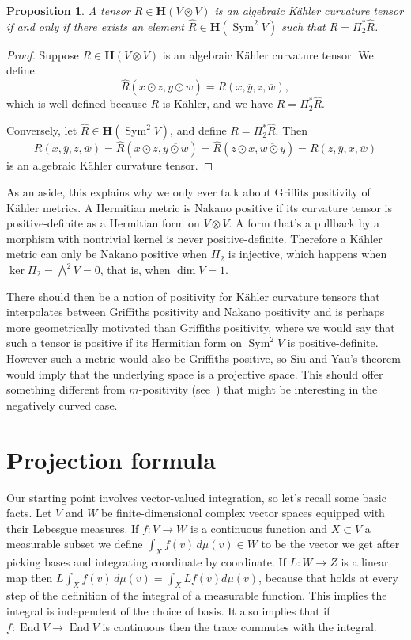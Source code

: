 \documentclass[10pt,a4paper]{amsart}
\newtheorem{prop}[theo]{Proposition}
\theoremstyle{definition}
\def\ov#1{\overline{#1}}
\def\d{\,d}
\def\herm{\mathbf{H}}
\DeclareMathOperator{\Sym}{Sym}
\DeclareMathOperator{\End}{End}
\begin{document}
\begin{prop}
A tensor $R \in \herm(V \otimes V)$ is an algebraic K\"ahler curvature tensor
if and only if there exists an element $\hat R \in \herm(\Sym^2 V)$ such that $R =
\Pi_2^* \hat R$.
\end{prop}

\begin{proof}
Suppose $R \in \herm(V \otimes V)$ is an algebraic K\"ahler curvature tensor.
We define
$$
\hat R(x \odot z, \ov{y \odot w})
= R(x, \ov y, z, \ov w),
$$
which is well-defined because $R$ is K\"ahler, and we have $R = \Pi_2^* \hat R$.

Conversely, let $\hat R \in \herm(\Sym^2 V)$, and define $R = \Pi_2^* \hat R$.
Then
$$
R(x, \ov y, z, \ov w)
= \hat R(x \odot z, \ov{y \odot w})
= \hat R(z \odot x, \ov{w \odot y})
= R(z, \ov y, x, \ov w)
$$
is an algebraic K\"ahler curvature tensor.
\end{proof}

As an aside, this explains why we only ever talk about Griffits
positivity of K\"ahler metrics.
A Hermitian metric is Nakano positive if its curvature tensor is
positive-definite as a Hermitian form on $V \otimes V$.
A form that's a pullback by a morphism with nontrivial
kernel is never positive-definite.
Therefore a K\"ahler metric can only be Nakano positive when $\Pi_2$ is
injective, which happens when $\ker \Pi_2 = \bigwedge^2 V = 0$,
that is, when $\dim V = 1$.

There should then be a notion of positivity for K\"ahler curvature tensors that
interpolates between Griffiths positivity and Nakano positivity and is perhaps
more geometrically motivated than Griffiths positivity, where we would say that
such a tensor is positive if its Hermitian form on $\Sym^2 V$ is
positive-definite.
However such a metric would also be Griffiths-positive, so Siu and Yau's
theorem would imply that the underlying space is a projective space. This
should offer something different from $m$-positivity (see~\cite[Chapter~7,
Definition~6.5]{agbook}) that might be interesting in the negatively curved
case.



\section{Projection formula}

Our starting point involves vector-valued integration, so let's recall
some basic facts.
Let $V$ and $W$ be finite-dimensional complex vector spaces equipped with their
Lebesgue measures.
If $f : V \to W$ is a continuous function and $X \subset V$ a measurable subset
we define $\int_X f(v) \d\mu(v) \in W$ to be the vector we get after picking
bases and integrating coordinate by coordinate.
If $L : W \to Z$ is a linear map then $L \int_X f(v) \d\mu(v) = \int_X Lf(v)
d\mu(v)$, because that holds at every step of the definition of the integral of
a measurable function.
This implies the integral is independent of the choice of basis.
It also implies that if $f : \End V \to \End V$ is continuous then the trace
commutes with the integral.
\end{document}

